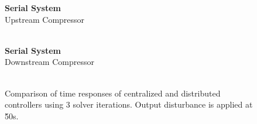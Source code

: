 \begin{figure}
  {\centering\small\textbf{Serial System}\\Upstream Compressor\\[0.5em]}
    \resizebox{0.48\linewidth}{!}{%
      
    }
  \hfill
    \resizebox{0.48\linewidth}{!}{%
      
    }
  \\
    \resizebox{0.48\linewidth}{!}{%
      
    }
  \hfill
    \resizebox{0.48\linewidth}{!}{%
      
    }

  {\centering\small\textbf{Serial System}\\Downstream Compressor\\[0.5em]}
    \resizebox{0.48\linewidth}{!}{%
      
    }
  \hfill
    \resizebox{0.48\linewidth}{!}{%
      
    }
  \\
    \resizebox{0.48\linewidth}{!}{%
      
    }
  \hfill
    \resizebox{0.48\linewidth}{!}{%
      
    }
    \caption[Time response of parallel system.]{Comparison of time responses of centralized and distributed controllers using 3 solver iterations. Output disturbance is applied at \u{50}{s}.}
  \label{fig:res:serial-timeresp}
\end{figure}


